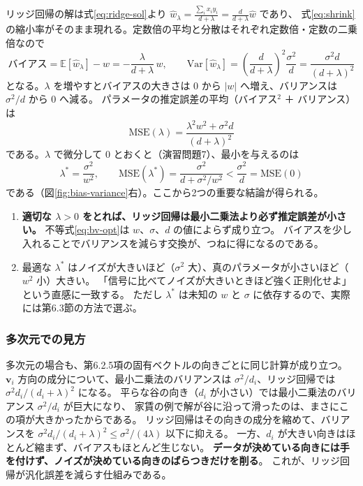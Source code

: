 リッジ回帰の解は式\eqref{eq:ridge-sol}より $\hat{w}_\lambda = \frac{\sum_i x_i y_i}{d + \lambda} = \frac{d}{d + \lambda}\hat{w}$ であり、
式\eqref{eq:shrink}の縮小率がそのまま現れる。定数倍の平均と分散はそれぞれ定数倍・定数の二乗倍なので
\begin{equation}
  \text{バイアス} = \mathbb{E}[\hat{w}_\lambda] - w = -\frac{\lambda}{d + \lambda}\,w, \qquad
  \mathrm{Var}[\hat{w}_\lambda] = \left( \frac{d}{d + \lambda} \right)^2 \frac{\sigma^2}{d} = \frac{\sigma^2 d}{(d + \lambda)^2}
  \label{eq:bv-ridge}
\end{equation}
となる。$\lambda$ を増やすとバイアスの大きさは $0$ から $|w|$ へ増え、バリアンスは $\sigma^2/d$ から $0$ へ減る。
パラメータの推定誤差の平均（バイアス$^2$ ＋ バリアンス）は
\begin{equation}
  \mathrm{MSE}(\lambda) = \frac{\lambda^2 w^2 + \sigma^2 d}{(d + \lambda)^2}
  \label{eq:bv-mse}
\end{equation}
である。$\lambda$ で微分して $0$ とおくと（演習問題7）、最小を与えるのは
\begin{equation}
  \lambda^* = \frac{\sigma^2}{w^2}, \qquad
  \mathrm{MSE}(\lambda^*) = \frac{\sigma^2}{d + \sigma^2/w^2} < \frac{\sigma^2}{d} = \mathrm{MSE}(0)
  \label{eq:bv-opt}
\end{equation}
である（図\ref{fig:bias-variance}右）。ここから2つの重要な結論が得られる。
\begin{enumerate}
  \item \textbf{適切な $\lambda > 0$ をとれば、リッジ回帰は最小二乗法より必ず推定誤差が小さい。}
    不等式\eqref{eq:bv-opt}は $w$、$\sigma$、$d$ の値によらず成り立つ。
    バイアスを少し入れることでバリアンスを減らす交換が、つねに得になるのである。
  \item 最適な $\lambda^*$ はノイズが大きいほど（$\sigma^2$ 大）、真のパラメータが小さいほど（$w^2$ 小）大きい。
    「信号に比べてノイズが大きいときほど強く正則化せよ」という直感に一致する。
    ただし $\lambda^*$ は未知の $w$ と $\sigma$ に依存するので、実際には第6.3節の方法で選ぶ。
\end{enumerate}

\subsubsection{多次元での見方}

多次元の場合も、第6.2.5項の固有ベクトルの向きごとに同じ計算が成り立つ。
$\bm{v}_i$ 方向の成分について、最小二乗法のバリアンスは $\sigma^2/d_i$、リッジ回帰では $\sigma^2 d_i/(d_i + \lambda)^2$ になる。
平らな谷の向き（$d_i$ が小さい）では最小二乗法のバリアンス $\sigma^2/d_i$ が巨大になり、
家賃の例で解が谷に沿って滑ったのは、まさにこの項が大きかったからである。
リッジ回帰はその向きの成分を縮めて、バリアンスを $\sigma^2 d_i/(d_i + \lambda)^2 \leq \sigma^2/(4\lambda)$ 以下に抑える。
一方、$d_i$ が大きい向きはほとんど縮まず、バイアスもほとんど生じない。
\textbf{データが決めている向きには手を付けず、ノイズが決めている向きのばらつきだけを削る}。
これが、リッジ回帰が汎化誤差を減らす仕組みである。


